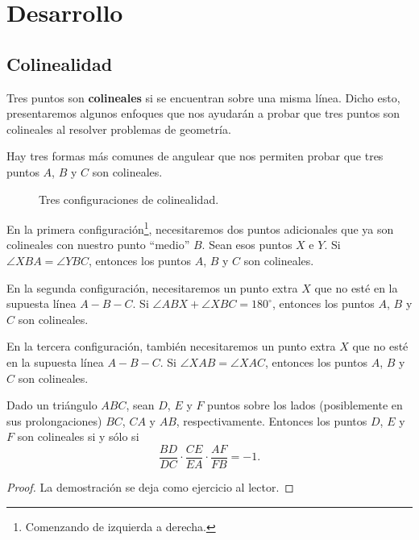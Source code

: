 \section{Desarrollo}



\subsection{Colinealidad}

\begin{figure}[H]
    \centering
    
\end{figure}

Tres puntos son \textbf{colineales} si se encuentran sobre una misma línea.
Dicho esto, presentaremos algunos enfoques que nos ayudarán a probar que tres puntos son colineales al resolver problemas de geometría.

Hay tres formas más comunes de angulear que nos permiten probar que tres puntos $A$, $B$ y $C$ son colineales.

\begin{figure}[H]
    \centering
    
    \caption{Tres configuraciones de colinealidad.}
\end{figure}

En la primera configuración\footnote{Comenzando de izquierda a derecha.}, necesitaremos dos puntos adicionales que ya son colineales con nuestro punto ``medio'' $B$.
Sean esos puntos $X$ e $Y$.
Si $\angle XBA = \angle YBC$, entonces los puntos $A$, $B$ y $C$ son colineales.

En la segunda configuración, necesitaremos un punto extra $X$ que no esté en la supuesta línea $A - B - C$.
Si $\angle ABX + \angle XBC = 180^\circ$, entonces los puntos $A$, $B$ y $C$ son colineales.

En la tercera configuración, también necesitaremos un punto extra $X$ que no esté en la supuesta línea $A - B - C$.
Si $\angle XAB = \angle XAC$, entonces los puntos $A$, $B$ y $C$ son colineales.


\begin{section-theorem.tcb}
    Dado un triángulo $ABC$, sean $D$, $E$ y $F$ puntos sobre los lados (posiblemente en sus prolongaciones) $BC$, $CA$ y $AB$, respectivamente.
    Entonces los puntos $D$, $E$ y $F$ son colineales si y sólo si
    \[
        \frac{BD}{DC} \cdot \frac{CE}{EA} \cdot \frac{AF}{FB} = -1.
    \]
\end{section-theorem.tcb}
\begin{proof}
    La demostración se deja como ejercicio al lector.
\end{proof}

